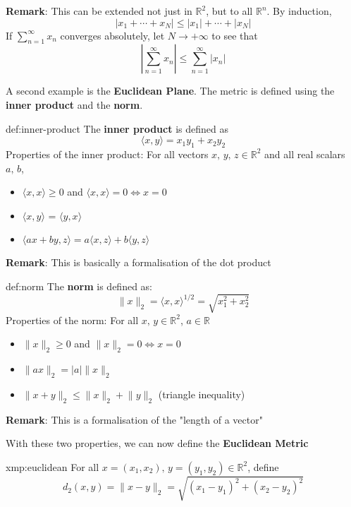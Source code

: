 \documentclass{article}
\begin{document}
\textbf{Remark}: This can be extended not just in $\mathbb{R}^{2}$, but to all $\mathbb{R}^{n}$. By induction,
\[\lvert x_{1} + \cdots + x_{N} \rvert \le \lvert x_{1} \rvert + \cdots + \lvert x_{N} \rvert\]
If $\displaystyle\sum_{n = 1}^{\infty}x_{n}$ converges absolutely, let $N\to +\infty$ to see that
\[\left\lvert \sum_{n = 1}^{\infty}x_{n} \right\rvert \le \sum_{n = 1}^{\infty} \lvert x_{n} \rvert\]


\newpage
A second example is the \textbf{Euclidean Plane}. The metric is defined using the \textbf{inner product} and the \textbf{norm}.

\begin{dfn}{def:inner-product}{}
    The \textbf{inner product} is defined as
    \[\langle x,y \rangle = x_{1}y_{1} + x_{2}y_{2}\]
    Properties of the inner product:
    For all vectors $x,\,y,\,z\in \mathbb{R}^{2}$ and all real scalars $a,\,b$,
    \begin{itemize}
        \item $\langle x,x \rangle\ge 0$ and $\langle x,x \rangle = 0 \iff x = 0$
        \item $\langle x,y \rangle$ = $\langle y,x \rangle$
        \item $\langle ax+by,z \rangle = a\langle x,z \rangle + b\langle y,z \rangle$
    \end{itemize}
\end{dfn}

\textbf{Remark}: This is basically a formalisation of the dot product

\begin{dfn}[Norm]{def:norm}{}
    The \textbf{norm} is defined as:
    \[\lVert x \rVert_{2} = \langle x,x \rangle^{1/2} = \sqrt{x^{2}_{1} + x^{2}_{2}}\]
    Properties of the norm: For all $x,\,y\in\mathbb{R}^{2}$, $a\in\mathbb{R}$
    \begin{itemize}
        \item $\lVert x \rVert_{2} \ge 0$ and $\lVert x \rVert_{2} = 0 \iff x = 0$
        \item $\lVert ax \rVert_{2} = \lvert a \rvert\lVert x \rVert_{2}$
        \item $\lVert x+y \rVert_{2} \le \lVert x \rVert_{2}+\lVert y \rVert_{2}$ (triangle inequality)
    \end{itemize}
\end{dfn}
\textbf{Remark}: This is a formalisation of the "length of a vector"

With these two properties, we can now define the \textbf{Euclidean Metric}
\begin{xmp}{xmp:euclidean}{}
    For all $x = (x_{1},x_{2}),\, y=(y_{1},y_{2})\in \mathbb{R}^{2}$, define
    \[d_{2}(x,y) = \lVert x-y \rVert_{2}=\sqrt{(x_{1}-y_{1})^{2} + (x_{2}-y_{2})^{2}}\]
\end{xmp}
\end{document}
